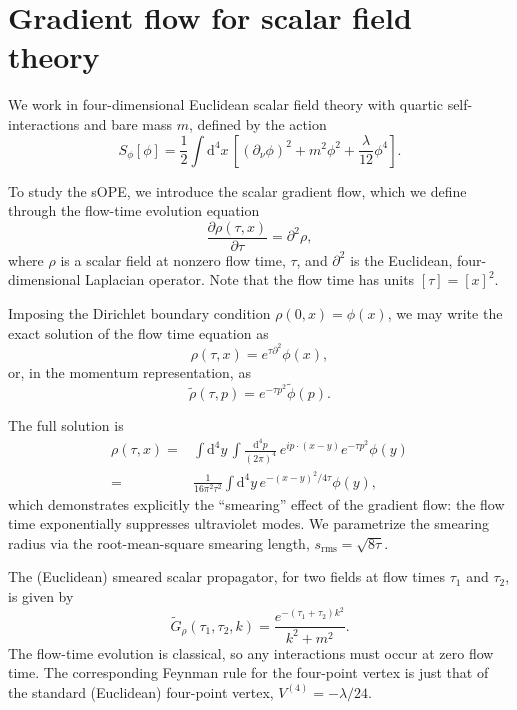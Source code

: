 \section{\label{sec:phi4}Gradient flow for scalar field theory}

We work in four-dimensional Euclidean scalar field theory with quartic 
self-interactions and bare mass $m$, defined by the action
\begin{equation}
S_\phi[\phi] = \frac{1}{2}\int \mathrm{d}^4x\, \left[(\partial_\nu  
\phi)^2 + m^2\phi^2 + \frac{\lambda}{12}\phi^4\right].
\end{equation}

To study the sOPE, we introduce the scalar 
gradient flow, which we define through the flow-time evolution equation
\begin{equation}
\frac{\partial \rho(\tau,x)}{\partial \tau}= \partial^2 \rho,
\end{equation}
where $\rho$ is a scalar field at nonzero flow time, $\tau$, and 
$\partial^2$ is the Euclidean, four-dimensional Laplacian operator. 
Note that the flow time has units $[\tau] = [x]^2$.

Imposing the Dirichlet 
boundary condition 
$\rho(0,x) = \phi(x)$, we may 
write the exact solution of the flow time equation as
\begin{equation}\label{eq:rhoexp}
\rho(\tau,x) = e^{\tau\partial^2}\phi(x),
\end{equation}
or, in the momentum representation, as
\begin{equation}
\tilde{\rho}(\tau,p) = e^{-\tau p^2}\tilde{\phi}(p).
\end{equation}

The full solution is
\begin{align}
\rho(\tau,x) = {} & \int\mathrm{d}^4y\,\int \frac{\mathrm{d}^4p}{(2\pi)^4} 
\,e^{ip\cdot(x-y)} e^{-\tau p^2} \phi(y) \nonumber\\
= {} &  \frac{1}{16\pi^2\tau^2}
\int\mathrm{d}^4y\,e^{-(x-y)^2/4\tau}\phi(y),
\end{align}
which demonstrates explicitly the ``smearing'' effect of the gradient flow: the 
flow time exponentially suppresses ultraviolet modes.  We 
parametrize the smearing radius via the root-mean-square smearing length, 
$s_{\mathrm{rms}} = \sqrt{8\tau}$.

The (Euclidean) smeared scalar propagator, for two fields at flow times 
$\tau_1$ and $\tau_2$, is given by
\begin{equation}
\widetilde{G}_\rho(\tau_1,\tau_2,k) = \frac{e^{-(\tau_1+\tau_2) k^2}}{k^2+m^2}.
\end{equation}
The flow-time evolution is classical, so any interactions must occur at 
zero flow time. The corresponding Feynman rule for the four-point vertex is 
just that of the standard (Euclidean) four-point vertex, $V^{(4)} = 
-\lambda/24$.
